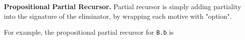 \textbf{Propositional Partial Recursor.} Partial recursor is simply adding partiality into the signature of the eliminator, by wrapping each motive with "option". 



For example, the propositional partial recursor for \texttt{B.b} is

